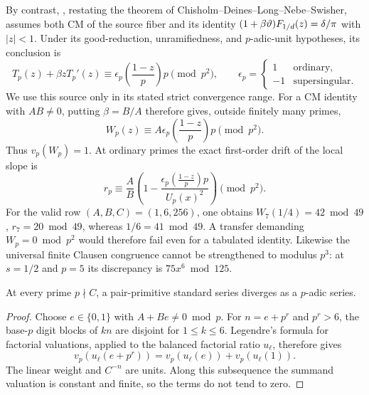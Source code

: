 By contrast, \cite[Theorem 2.1]{BRSTT}, restating the theorem of
Chisholm--Deines--Long--Nebe--Swisher, assumes both CM of the
source fiber and its identity
$(1+\beta\vartheta)F_{1/d}(z)=\delta/\pi$ with $|z|<1$.
Under its good-reduction, unramifiedness, and $p$-adic-unit
hypotheses, its conclusion is
\begin{equation}\label{eq:cm-weighted-first-order}
 T_p(z)+\beta zT_p'(z)
       \equiv\epsilon_p\left(\frac{1-z}{p}\right)p\pmod{p^2},
 \qquad
 \epsilon_p=\begin{cases}1&\text{ordinary},\\-1&\text{supersingular}.
                         \end{cases}
\end{equation}
We use this source only in its stated strict convergence range.
For a CM identity with $AB\ne0$, putting $\beta=B/A$ therefore
gives, outside finitely many primes,
\begin{equation}\label{eq:cm-Wp-nonzero-p2}
 W_p(z)\equiv A\epsilon_p\left(\frac{1-z}{p}\right)p\pmod{p^2}.
\end{equation}
Thus $v_p(W_p)=1$.  At ordinary primes the exact first-order drift
of the local slope is
\[
 r_p\equiv\frac AB\left(1-
       \frac{\epsilon_p\left(\frac{1-z}{p}\right)p}{U_p(x)^2}
                   \right)\pmod{p^2}.
\]
For the valid row $(A,B,C)=(1,6,256)$, one obtains
$W_7(1/4)=42\bmod49$, $r_7=20\bmod49$, whereas
$1/6=41\bmod49$.  A transfer demanding $W_p=0\bmod p^2$
would therefore fail even for a tabulated identity.  Likewise the
universal finite Clausen congruence cannot be strengthened to
modulus $p^3$: at $s=1/2$ and $p=5$ its discrepancy is
$75x^6\bmod125$.

\begin{lemma}
\label{lem:padic-divergence}
At every prime $p\nmid C$, a pair-primitive standard series
diverges as a $p$-adic series.
\end{lemma}
\begin{proof}
Choose $e\in\{0,1\}$ with $A+Be\ne0\bmod p$.  For
$n=e+p^r$ and $p^r>6$, the base-$p$ digit blocks of $kn$ are
disjoint for $1\le k\le6$.  Legendre's formula for factorial
valuations, applied to the balanced factorial ratio $u_\ell$,
therefore gives
\[
 v_p(u_\ell(e+p^r))=v_p(u_\ell(e))+v_p(u_\ell(1)).
\]
The linear weight and $C^{-n}$ are units.  Along this subsequence
the summand valuation is constant and finite, so the terms do not
tend to zero.
\end{proof}

